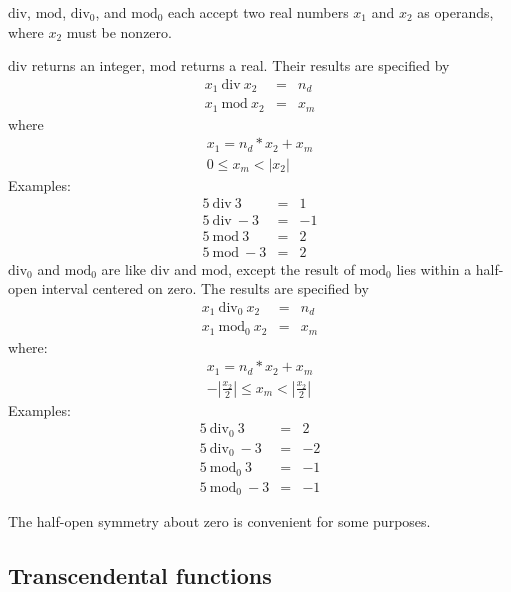 $\mathrm{div}$, $\mathrm{mod}$, $\mathrm{div}_0$, and $\mathrm{mod}_0$
each accept two real numbers $x_1$ and $x_2$ as operands, where
$x_2$ must be nonzero.

$\mathrm{div}$ returns an integer, $\mathrm{mod}$ returns a real.
Their results are specified by
%
\begin{eqnarray*}
x_1~\mathrm{div}~x_2 &=& n_d\\
x_1~\mathrm{mod}~x_2 &=& x_m
\end{eqnarray*}
%
where
%
\begin{displaymath}
\begin{array}{c}
x_1 = n_d * x_2 + x_m\\
0 \leq x_m < |x_2|
\end{array}
\end{displaymath}
%
Examples:
\begin{eqnarray*}
5~\mathrm{div}~3    &=&  1\\
5~\mathrm{div}~-3   &=&  -1\\
5~\mathrm{mod}~3    &=&  2\\
5~\mathrm{mod}~-3   &=&  2
\end{eqnarray*}
%
$\mathrm{div}_0$ and $\mathrm{mod}_0$ are like $\mathrm{div}$ and
$\mathrm{mod}$, except the result of $\mathrm{mod}_0$ lies within a
half-open interval centered on zero.  The results are specified by
%
\begin{eqnarray*}
x_1~\mathrm{div}_0~x_2 &=& n_d\\
x_1~\mathrm{mod}_0~x_2 &=& x_m
\end{eqnarray*}
%
where:
%
\begin{displaymath}
\begin{array}{c}
x_1 = n_d * x_2 + x_m\\
-|\frac{x_2}{2}| \leq x_m < |\frac{x_2}{2}|
\end{array}
\end{displaymath}
%
Examples:
%
\begin{eqnarray*}
5~\mathrm{div}_0~3    &=&  2\\
5~\mathrm{div}_0~-3   &=&  -2\\
5~\mathrm{mod}_0~3    &=&  -1\\
5~\mathrm{mod}_0~-3   &=&  -1
\end{eqnarray*}

\begin{rationale}
The half-open symmetry about zero is convenient for some purposes.
\end{rationale}

\subsection{Transcendental functions}
\label{transcendentalfunctions}

